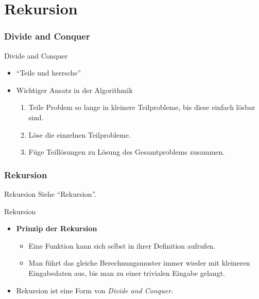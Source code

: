 \documentclass[18pt]{beamer}
\newcommand{\quotes}[1]{``#1''}
\begin{document}
\section{Rekursion}

\subsubsection{Divide and Conquer}

\begin{frame}{Divide and Conquer}
    \begin{itemize}
        \item \quotes{Teile und herrsche}
        \item Wichtiger Ansatz in der Algorithmik
        \vspace{.2in}
        \begin{enumerate}
            \item Teile Problem so lange in kleinere Teilprobleme, bis diese einfach lösbar sind.
            \item Löse die einzelnen Teilprobleme.
            \item Füge Teillösungen zu Lösung des Gesamtproblems zusammen.
        \end{enumerate}
    \end{itemize}
\end{frame}

\subsubsection{Rekursion}

\begin{frame}{Rekursion}
    Siehe \quotes{Rekursion}.
\end{frame}

\begin{frame}{Rekursion}
    \begin{itemize}
        \item \textbf{Prinzip der Rekursion}
        \begin{itemize}
            \item Eine Funktion kann sich selbst in ihrer Definition aufrufen.
            \item Man führt das gleiche Berechnungsmuster immer wieder mit kleineren Eingabedaten aus,
            bis man zu einer trivialen Eingabe gelangt.
        \end{itemize}
        \pause
        \vspace{.2in}
        \item Rekursion ist eine Form von \textit{Divide and Conquer}.
    \end{itemize}
\end{frame}
\end{document}
